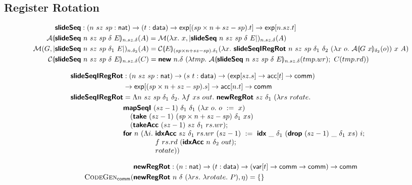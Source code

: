 \subsection{Register Rotation}

{\footnotesize
\begin{align*}
&\bm{\mathsf{slideSeq}} : (n~sz~sp : \mathsf{nat}) \to (t : \mathsf{data}) \to \mathsf{exp}[(sp \times n + sz - sp).t] \to \mathsf{exp}[n.sz.t]
\\
\mathcal{A}\llparenthesis &\bm{\mathsf{slideSeq}}~n~sz~sp~\delta~E \rrparenthesis_{n.sz.\delta}(A) = \mathcal{M}(\lambda x.~x, |\bm{\mathsf{slideSeq}}~n~sz~sp~\delta~E|)_{n.sz.\delta}(A)
\\
\mathcal{M}(G, |&\bm{\mathsf{slideSeq}}~n~sz~sp~\delta_1~E|)_{n.\delta_2}(A) = \mathcal{C}\llparenthesis E \rrparenthesis_{(sp \times n + sz - sp).\delta_1}(\lambda x.~\bm{\mathsf{slideSeqIRegRot}}~n~sz~sp~\delta_1~\delta_2~(\lambda x~o.~\mathcal{A}\llparenthesis G~x \rrparenthesis_{\delta_2}(o))~x~A)
\\
\mathcal{C}\llparenthesis &\bm{\mathsf{slideSeq}}~n~sz~sp~\delta~E \rrparenthesis_{n.sz.\delta}(C) = \bm{\mathsf{new}}~n.\delta~(\lambda tmp.~\mathcal{A}\llparenthesis \bm{\mathsf{slideSeq}}~n~sz~sp~\delta~E \rrparenthesis_{n.sz.\delta}(tmp.wr);~C(tmp.rd))
\end{align*}

\begin{align*}
\prim{slideSeqIRegRot} &: (n~sz~sp : \natkind) \to (\dtone~\dttwo : \datatype) \to (\tyexp[sz.\dtone] \to \tyacc[\dttwo] \to \tycomm) \\ &\to \tyexp[(sp \times n + sz - sp).\dtone] \to \tyacc[n.\dttwo] \to \tycomm \\
\prim{slideSeqIRegRot} &= \Lambda n~sz~sp~\delta_1~\delta_2.~\lambda f~xs~out.~\prim{newRegRot}~sz~\delta_1~(\lambda rs~rotate.\\
  &\begin{array}[t]{@{}l}
    \prim{mapSeqI}~(sz - 1)~\delta_1~\delta_1~(\lambda x~o.~o~:=~x) \\
    \quad (\prim{take}~(sz - 1)~(sp \times n + sz - sp)~\delta_1~xs) \\
    \quad (\prim{takeAcc}~(sz - 1)~sz~\delta_1~rs.wr); \\
    \prim{for}~n~(\Lambda i.~
      \begin{array}[t]{@{}l}
        \prim{idxAcc}~sz~\delta_1~rs.wr~(sz - 1)~:=~\prim{idx}~\_~\delta_1~(\prim{drop}~(sz - 1)~\_~\delta_1~xs)~i; \\
        f~rs.rd~(\prim{idxAcc}~n~\delta_2~out); \\
        rotate))
      \end{array}
  \end{array}
\end{align*}

\begin{align*}
&\bm{\mathsf{newRegRot}} : (n : \mathsf{nat}) \to (t : \mathsf{data}) \to (\mathsf{var}[t] \to \mathsf{comm} \to \mathsf{comm}) \to \mathsf{comm}
\\
\textsc{CodeGen}_{\mathsf{comm}}(&\bm{\mathsf{newRegRot}}~n~\delta~(\lambda rs.~\lambda rotate.~P), \eta) = \{\}
\end{align*}
}